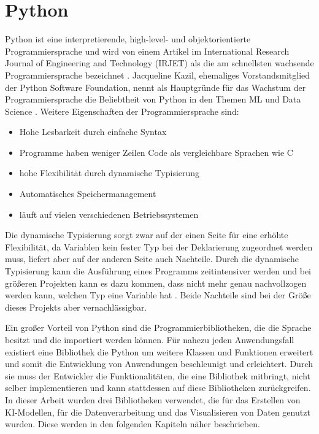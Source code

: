 \section{Python}
\label{chap:Python}

Python ist eine interpretierende, high-level- und objektorientierte Programmiersprache und wird von einem Artikel 
im International Research Journal of Engineering and Technology (IRJET) als die am schnellsten wachsende Programmiersprache 
bezeichnet \cite[vgl. S.354]{Python}. Jacqueline Kazil, ehemaliges Vorstandsmitglied der Python Software Foundation,
nennt als Hauptgründe für das Wachstum der Programmiersprache die Beliebtheit von Python in den Themen \ac{ML} und Data Science \cite[vgl. S.354]{Python}.
Weitere Eigenschaften der Programmiersprache sind:
\begin{itemize}
    \item Hohe Lesbarkeit durch einfache Syntax \cite[vgl. S.354]{Python}
    \item Programme haben weniger Zeilen Code als vergleichbare Sprachen wie C \cite[vgl. S.354]{Python}
    \item hohe Flexibilität durch dynamische Typisierung \cite[vgl. S.354]{Python}
    \item Automatisches Speichermanagement \cite[vgl. S.354]{Python}
    \item läuft auf vielen verschiedenen Betriebssystemen \cite[vgl. S.355]{Python}
\end{itemize}
Die dynamische Typisierung sorgt zwar auf der einen Seite für eine erhöhte Flexibilität, da Variablen kein fester Typ bei der Deklarierung zugeordnet werden muss,
liefert aber auf der anderen Seite auch Nachteile. Durch die dynamische Typisierung kann die Ausführung eines Programms zeitintensiver werden und bei größeren 
Projekten kann es dazu kommen, dass nicht mehr genau nachvollzogen werden kann, welchen Typ eine Variable hat \cite[vgl. S.355]{Python}. Beide Nachteile sind bei der Größe
dieses Projekts aber vernachlässigbar. 

Ein großer Vorteil von Python sind die Programmierbibliotheken, die die Sprache besitzt und die importiert werden können. Für nahezu jeden Anwendungsfall existiert eine 
Bibliothek die Python um weitere Klassen und Funktionen erweitert und somit die Entwicklung von Anwendungen beschleunigt und erleichtert. Durch sie muss 
der Entwickler die Funktionalitäten, die eine Bibliothek mitbringt, nicht selber implementieren und kann stattdessen auf diese Bibliotheken zurückgreifen. 
In dieser Arbeit wurden drei Bibliotheken verwendet, die für das Erstellen von \ac{KI}-Modellen, für die Datenverarbeitung und das Visualisieren von Daten
genutzt wurden. Diese werden in den folgenden Kapiteln näher beschrieben.

